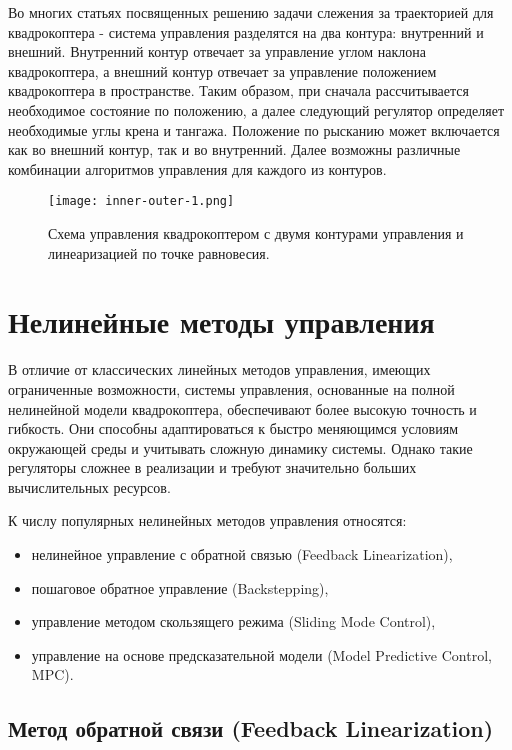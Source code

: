Во многих статьях посвященных решению задачи слежения за траекторией для квадрокоптера - система управления разделятся на два контура: внутренний и внешний.
Внутренний контур отвечает за управление углом наклона квадрокоптера, а внешний контур отвечает за управление положением квадрокоптера в пространстве.
Таким образом, при сначала рассчитывается необходимое состояние по положению, а далее следующий регулятор определяет 
необходимые углы крена и тангажа. Положение по рысканию может включается как во внешний контур\cite{Linearization_two}, так и во внутренний\cite{LQR_feedback}.
Далее возможны различные комбинации алгоритмов управления для каждого из контуров.


\begin{figure}[ht]
    \centering
    \texttt{[image: inner-outer-1.png]}
    \caption{Схема управления квадрокоптером с двумя контурами управления и линеаризацией по точке равновесия.}
    \label{fig:inner-outer-1}
\end{figure}


\section{Нелинейные методы управления}


В отличие от классических линейных методов управления, имеющих ограниченные возможности, 
системы управления, основанные на полной нелинейной модели квадрокоптера, обеспечивают более высокую точность и гибкость. 
Они способны адаптироваться к быстро меняющимся условиям окружающей среды и учитывать сложную динамику системы. 
Однако такие регуляторы сложнее в реализации и требуют значительно больших вычислительных ресурсов.

К числу популярных нелинейных методов управления относятся:

\begin{itemize}
    \item нелинейное управление с обратной связью (Feedback Linearization),
    \item пошаговое обратное управление (Backstepping),
    \item управление методом скользящего режима (Sliding Mode Control),
    \item управление на основе предсказательной модели (Model Predictive Control, MPC).
\end{itemize}


\subsection{Метод обратной связи (Feedback Linearization)}

